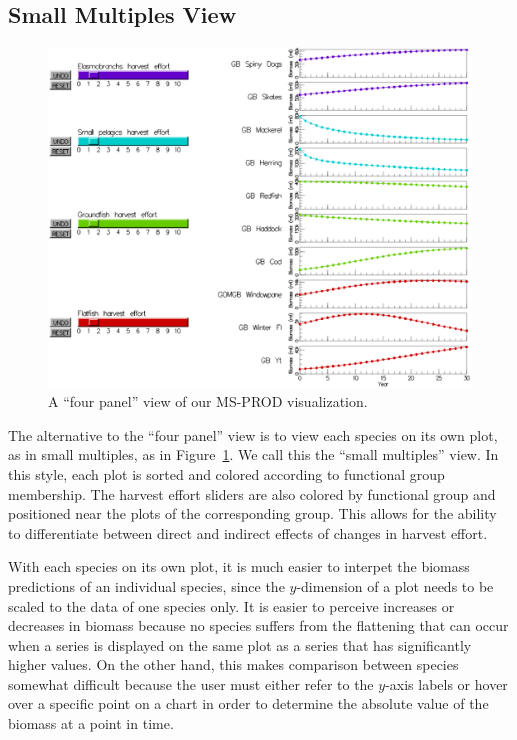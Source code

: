 \subsection{Small Multiples View}

\begin{figure}[h]
	\centering
	\includegraphics[width=13cm]{figures/eps/msprod_species.eps}
	\caption{A ``four panel'' view of our MS-PROD visualization.}
	\label{fig:msprod_species}
\end{figure}

The alternative to the ``four panel'' view is to view each species on its own plot, as in small multiples, as in Figure~\ref{fig:msprod_species}.  We call this the ``small multiples'' view.  In this style, each plot is sorted and colored according to functional group membership.  The harvest effort sliders are also colored by functional group and positioned near the plots of the corresponding group.  This allows for the ability to differentiate between direct and indirect effects of changes in harvest effort.

With each species on its own plot, it is much easier to interpet the biomass predictions of an individual species, since the $y$-dimension of a plot needs to be scaled to the data of one species only.  It is easier to perceive increases or decreases in biomass because no species suffers from the flattening that can occur when a series is displayed on the same plot as a series that has significantly higher values.  On the other hand, this makes comparison between species somewhat difficult because the user must either refer to the $y$-axis labels or hover over a specific point on a chart in order to determine the absolute value of the biomass at a point in time.


